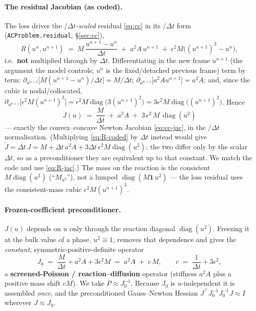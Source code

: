 \documentclass[11pt]{article}
\newcommand{\dt}{\Delta t}
\DeclareMathOperator{\diag}{diag}
\begin{document}
\paragraph{The residual Jacobian (as coded).} The loss drives the \emph{$/\dt$-scaled} residual
\eqref{eq:cc} in its $/\dt$ form (\texttt{ACProblem.residual}, \S\ref{sec:cc}),
\begin{equation}
  R(u^{n},u^{n+1}) \;=\; M\,\frac{u^{n+1}-u^{n}}{\dt} \;+\; a^2A\,u^{n+1}
     \;+\; \epsilon^2 M\big((u^{n+1})^3 - u^{n}\big),
  \label{eq:R-coded}
\end{equation}
i.e.\ \textbf{not} multiplied through by $\dt$. Differentiating in the new frame $u^{n+1}$ (the
argument the model controls; $u^n$ is the fixed/detached previous frame) term by term:
$\partial_{u^{n+1}}\big[M(u^{n+1}-u^n)/\dt\big]=M/\dt$;
$\partial_{u^{n+1}}\big[a^2Au^{n+1}\big]=a^2A$; and, since the cubic is nodal/collocated,
$\partial_{u^{n+1}}\big[\epsilon^2 M(u^{n+1})^3\big]=\epsilon^2 M\diag\!\big(3(u^{n+1})^2\big)
=3\epsilon^2 M\diag\!\big((u^{n+1})^2\big)$. Hence
\begin{equation}
  \boxed{\;
  J(u) \;=\; \frac{M}{\dt} \;+\; a^2 A \;+\; 3\,\epsilon^2\,M\,\diag(u^2)
  \;}
  \label{eq:R-jac}
\end{equation}
--- exactly the convex--concave Newton Jacobian \eqref{eq:cc-jac}, in the $/\dt$ normalisation.
(Multiplying \eqref{eq:R-coded} by $\dt$ instead would give $\tilde J=\dt\,J=M+\dt\,a^2A
+3\dt\,\epsilon^2M\diag(u^2)$; the two differ only by the scalar $\dt$, so as a preconditioner
they are equivalent up to that constant. We match the code and use \eqref{eq:R-jac}.) The mass on
the reaction is the consistent $M\diag(u^2)$ (``$M_{u^2}$''), not a lumped $\diag(M\mathbf1\,u^2)$
--- the loss residual uses the consistent-mass cubic $\epsilon^2M(u^{n+1})^3$.

\paragraph{Frozen-coefficient preconditioner.} $J(u)$ depends on $u$ only through the reaction
diagonal $\diag(u^2)$. Freezing it at the bulk value of a phase, $u^2\equiv1$, removes that
dependence and gives the \emph{constant}, symmetric-positive-definite operator
\begin{equation}
  J_0 \;=\; \frac{M}{\dt} + a^2A + 3\epsilon^2 M
      \;=\; a^2 A \;+\; c\,M,\qquad
      c \;=\; \frac{1}{\dt} + 3\epsilon^2 ,
  \label{eq:J0}
\end{equation}
a \textbf{screened-Poisson / reaction--diffusion} operator (stiffness $a^2A$ plus a positive mass
shift $cM$). We take $P\approx J_0^{-1}$. Because $J_0$ is $u$-independent it is assembled
\emph{once}, and the preconditioned Gauss--Newton Hessian $J^\top J_0^{-1}J_0^{-1}J\approx I$
wherever $J\approx J_0$.
\end{document}
